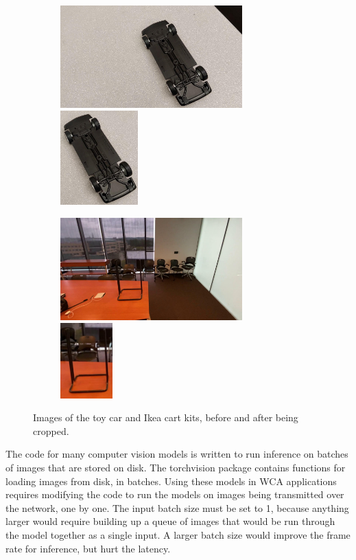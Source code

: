 \begin{figure}
  \begin{subfigure}{\textwidth}
    \includegraphics[width=7cm]{figures/two_stage/car_original.jpg}
    \includegraphics[width=3cm]{figures/two_stage/car_crop.jpg}
  \end{subfigure}
  \begin{subfigure}{\textwidth}
    \includegraphics[width=7cm]{figures/two_stage/cart_original.jpg}
    \includegraphics[width=2cm]{figures/two_stage/cart_crop.jpg}
  \end{subfigure}
  \caption{
    Images of the toy car and Ikea cart kits, before and after being cropped.
  }\label{fig:crop_examples}
\end{figure}

The code for many computer vision models is written to run inference on batches
of images that are stored on disk. The torchvision package contains functions
for loading images from disk, in batches. Using these models in WCA applications
requires modifying the code to run the models on images being transmitted over
the network, one by one. The input batch size must be set to 1, because anything
larger would require building up a queue of images that would be run through the
model together as a single input. A larger batch size would improve the
frame rate for inference, but hurt the latency.

